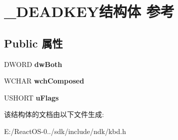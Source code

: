 \hypertarget{struct___d_e_a_d_k_e_y}{}\section{\+\_\+\+D\+E\+A\+D\+K\+E\+Y结构体 参考}
\label{struct___d_e_a_d_k_e_y}
\subsection*{Public 属性}
\begin{DoxyCompactItemize}
\item 
\mbox{\label{struct___d_e_a_d_k_e_y_a8bbf1029cd6d99463bdcf23472bd263c}} 
D\+W\+O\+RD {\bfseries dw\+Both}
\item 
\mbox{\label{struct___d_e_a_d_k_e_y_a85af92dc0d7037dca3d5b56e54a86dc6}} 
W\+C\+H\+AR {\bfseries wch\+Composed}
\item 
\mbox{\label{struct___d_e_a_d_k_e_y_af34a2bfbcc248bcc12d940aaa27960c0}} 
U\+S\+H\+O\+RT {\bfseries u\+Flags}
\end{DoxyCompactItemize}


该结构体的文档由以下文件生成\+:\begin{DoxyCompactItemize}
\item 
E\+:/\+React\+O\+S-\/0../sdk/include/ndk/kbd.\+h\end{DoxyCompactItemize}
